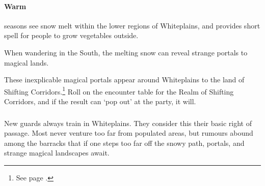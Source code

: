 \begin{multicols}{2}
\paragraph{Warm} seasons see snow melt within the lower regions of Whiteplains, and provides short spell for people to grow vegetables outside.

When wandering in the South, the melting snow can reveal strange portals to magical lands.

These inexplicable magical portals appear around Whiteplains to the land of Shifting Corridors.\footnote{See page \pageref{shiftingcorridors}.}
Roll on the encounter table for the Realm of Shifting Corridors, and if the result can `pop out' at the party, it will.

\subsubsection{}

New guards always train in Whiteplains.
They consider this their basic right of passage.
Most never venture too far from populated areas, but rumours abound among the barracks that if one steps too far off the snowy path, portals, and strange magical landscapes await.

\end{multicols}

\vfill\null
